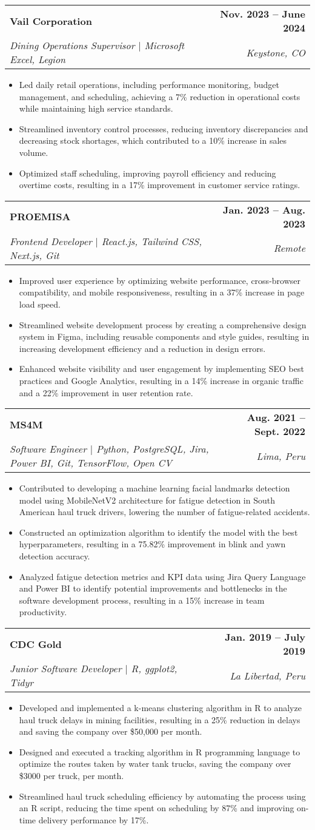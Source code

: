 \documentclass[letterpaper,11pt]{article}
\makeatletter
\newcommand{\resumeItem}[1]{
  \item\small{
    {#1 \vspace{-2pt}}
  }
}
\newcommand{\resumeSubheading}[4]{
  \vspace{-2pt}\item
    \begin{tabular*}{1.0\textwidth}[t]{l@{\extracolsep{\fill}}r}
      \textbf{#1} & \textbf{\small #2} \\
      \textit{\small#3} & \textit{\small #4} \\
    \end{tabular*}\vspace{-7pt}
}
\newcommand{\resumeItemListStart}{\begin{itemize}}
\newcommand{\resumeItemListEnd}{\end{itemize}\vspace{-5pt}}
\makeatother
\begin{document}
  \resumeSubheading
  {Vail Corporation}{Nov. 2023 -- June 2024}
  {Dining Operations Supervisor $|$ Microsoft Excel, Legion}{Keystone, CO}
  \resumeItemListStart
    \resumeItem{Led daily retail operations, including performance monitoring, budget management, and scheduling, achieving a 7\% reduction in operational costs while maintaining high service standards.}
    \resumeItem{Streamlined inventory control processes, reducing inventory discrepancies and decreasing stock shortages, which contributed to a 10\% increase in sales volume.}
    \resumeItem{Optimized staff scheduling, improving payroll efficiency and reducing overtime costs, resulting in a 17\% improvement in customer service ratings.}
  \resumeItemListEnd
 
  \resumeSubheading
  {PROEMISA}{Jan. 2023 -- Aug. 2023}
  {Frontend Developer $|$ React.js, Tailwind CSS, Next.js, Git}{Remote}
  \resumeItemListStart
    \resumeItem{Improved user experience by optimizing website performance, cross-browser compatibility, and mobile responsiveness, resulting in a 37\% increase in page load speed.}
    \resumeItem{Streamlined website development process by creating a comprehensive design system in Figma, including reusable components and style guides, resulting in increasing development efficiency and a reduction in design errors.}
    \resumeItem{Enhanced website visibility and user engagement by implementing SEO best practices and Google Analytics, resulting in a 14\% increase in organic traffic and a 22\% improvement in user retention rate.}
  \resumeItemListEnd

  \resumeSubheading
    {MS4M}{Aug. 2021 -- Sept. 2022}
    {Software Engineer $|$ Python, PostgreSQL, Jira, Power BI, Git, TensorFlow, Open CV}{Lima, Peru}
    \resumeItemListStart
      \resumeItem{Contributed to developing a machine learning facial landmarks detection model using MobileNetV2 architecture for fatigue detection in South American haul truck drivers, lowering the number of fatigue-related accidents.}
      \resumeItem{Constructed an optimization algorithm to identify the model with the best hyperparameters, resulting in a 75.82\% improvement in blink and yawn detection accuracy.}
      \resumeItem{Analyzed fatigue detection metrics and KPI data using Jira Query Language and Power BI to identify potential improvements and bottlenecks in the software development process, resulting in a 15\% increase in team productivity.}
    \resumeItemListEnd

  \resumeSubheading
    {CDC Gold}{Jan. 2019 -- July 2019}
    {Junior Software Developer $|$ R, ggplot2, Tidyr}{La Libertad, Peru}
    \resumeItemListStart
      \resumeItem{Developed and implemented a k-means clustering algorithm in R to analyze haul truck delays in mining facilities, resulting in a 25\% reduction in delays and saving the company over \$50,000 per month.}
      \resumeItem{Designed and executed a tracking algorithm in R programming language to optimize the routes taken by water tank trucks, saving the company over \$3000 per truck, per month.}
      \resumeItem{Streamlined haul truck scheduling efficiency by automating the process using an R script, reducing the time spent on scheduling by 87\% and improving on-time delivery performance by 17\%.}
  \resumeItemListEnd
    
\end{document}

